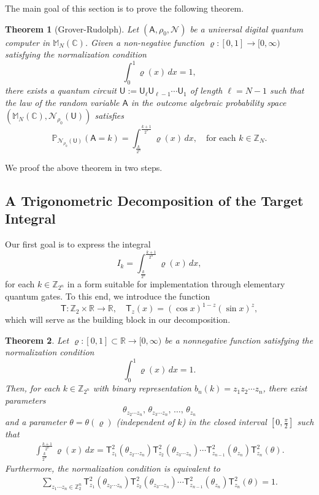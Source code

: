 \documentclass[a4paper,11pt]{article}
\newtheorem{theorem}{Theorem}[section]
\newcommand{\rU}{\mathsf{U}}
\newcommand{\rA}{\mathsf{A}}
\begin{document}
The main goal of this section is to prove the following theorem.

\begin{theorem}[Grover-Rudolph]\label{theorem:Grover-Rudolph}
Let $(\rA, \rho_0, \mathcal{N})$ be a universal digital quantum computer in $\mathbb{M}_N(\mathbb{C})$. Given a non-negative function \(\varrho: [0,1] \to [0,\infty)\) satisfying the normalization condition
\[
\int_0^1 \varrho(x) \, dx = 1,
\]
there exists a quantum circuit \(\rU := \rU_{\ell} \rU_{\ell-1} \cdots \rU_1\) of length \(\ell = N-1\) such that the law of the random variable \(\rA\) in the outcome algebraic probability space \((\mathbb{M}_N(\mathbb{C}), \mathcal{N}_{\rho_0}(\rU))\) satisfies
\[
\mathbb{P}_{\mathcal{N}_{\rho_0}(\rU)}(\rA = k) = \int_{\frac{k}{2^n}}^{\frac{k+1}{2^n}} \varrho(x) \, dx, \quad \text{for each } k \in \mathbb{Z}_N.
\]
\end{theorem}

We proof the above theorem in two steps.

\subsection{A Trigonometric Decomposition of the Target Integral}

Our first goal is to express the integral
\[
I_k = \int_{\frac{k}{2^n}}^{\frac{k+1}{2^n}} \varrho(x)\,dx,
\]
for each \(k \in \mathbb{Z}_{2^n}\) in a form suitable for implementation through elementary quantum gates. To this end, we introduce the function
\[
\mathsf{T}:\mathbb{Z}_2 \times \mathbb{R} \to \mathbb{R}, \quad \mathsf{T}_z(x) = (\cos x)^{1-z}(\sin x)^z,
\]
which will serve as the building block in our decomposition.

\begin{theorem}\label{Rudolph-Grover-Proposition}
  Let \(\varrho: [0,1] \subset \mathbb{R} \to [0,\infty) \) be a nonnegative function satisfying the normalization condition
  \[
  \int _0^1 \varrho (x) \, dx = 1.
  \]
  Then, for each \(k \in \mathbb{Z}_{2^n}\) with binary representation \(b_n(k) = z_1z_2\cdots z_n\), 
  there exist parameters
  \[
  \theta_{z_2\cdots z_n},\,\theta_{z_3\cdots z_n},\,\ldots,\,\theta_{z_n}
  \]
  and a parameter \(\theta = \theta(\varrho)\) (independent of \(k\)) in the closed interval \(\left[0,\frac{\pi}{2}\right]\) such that
  \begin{align}
    \int_{\frac{k}{2^n}}^{ \frac{k+1}{2^n}}  \varrho(x) \, dx =  \mathsf{T}_{z_1}^2(\theta_{z_{2}\cdots z_n})\mathsf{T}_{z_{2}}^2(\theta_{z_{3}\cdots z_n}) \cdots \mathsf{T}_{z_{n-1}}^2(\theta_{z_n})\mathsf{T}_{z_n}^2(\theta). \label{eq:proposition}
  \end{align}
  Furthermore, the normalization condition is equivalent to
  \begin{align}\label{eq:proposition2}
    \sum_{z_1\cdots z_n \in \mathbb{Z}_2^n} \mathsf{T}_{z_1}^2(\theta_{z_{2}\cdots z_n})\mathsf{T}_{z_{2}}^2(\theta_{z_{3}\cdots z_n}) \cdots \mathsf{T}_{z_{n-1}}^2(\theta_{z_n})\mathsf{T}_{z_n}^2(\theta) = 1.
  \end{align}
\end{theorem}
\end{document}

